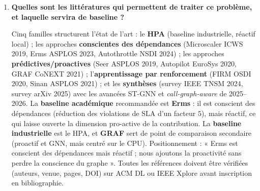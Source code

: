\documentclass[11pt,a4paper]{article}
\begin{document}
\begin{enumerate}[label=\textbf{Q\arabic*.}, leftmargin=*, itemsep=0.6em]
En trois étages. \emph{(i) Spécification} : \texttt{requests} (garantie, dénominateur du calcul HPA) et \texttt{limits} (plafond), avec \( \text{request} \le \text{limit} \). \emph{(ii) Placement} par le scheduler : filtrage des nœuds faisables \( u \in \mathcal{U}_{\text{feasible}} \) vérifiant
\[
 \sum_{c \in \text{conteneurs}(p)} \text{request}_{c,r} \;\le\; \text{capacité}_r(u) - \sum_{p' \in \text{pods}(u)} \sum_{c} \text{request}_{p',r},
\]
puis scoring \( \sum_i w_i\, s_i(u,p) \). \emph{(iii) Application et éviction} : cgroups et classes de QoS \textsc{BestEffort} \( \prec \) \textsc{Burstable} \( \prec \) \textsc{Guaranteed}. En surplomb : \texttt{ResourceQuota} (contrainte budgétaire agrégée, analogue à \( \sum_i c_i n_i(t) \le B(t) \)) et \texttt{LimitRange} (bornes par objet). Point clé : cette chaîne ne décide jamais \( n_i(t) \) ; le HPA est un contrôleur séparé dont la décision est ensuite consommée par le scheduler.

\item \textbf{Quelles sont les littératures qui permettent de traiter ce problème, et laquelle servira de baseline ?}

Cinq familles structurent l'état de l'art : le \textbf{HPA} (baseline industrielle, réactif local) ; les approches \textbf{conscientes des dépendances} (Microscaler ICWS 2019, Erms ASPLOS 2023, Autothrottle NSDI 2024) ; les approches \textbf{prédictives/proactives} (Seer ASPLOS 2019, Autopilot EuroSys 2020, GRAF CoNEXT 2021) ; l'\textbf{apprentissage par renforcement} (FIRM OSDI 2020, Sinan ASPLOS 2021) ; et les \textbf{synthèses} (survey IEEE TNSM 2024, survey arXiv 2025) avec les avancées ST-GNN et \emph{call-graph-aware} de 2025--2026. La \textbf{baseline académique} recommandée est \textbf{Erms} : il est conscient des dépendances (réduction des violations de SLA d'un facteur \(5\)), mais réactif, ce qui laisse ouverte la dimension pro-active de la contribution. La \textbf{baseline industrielle} est le HPA, et \textbf{GRAF} sert de point de comparaison secondaire (proactif et GNN, mais centré sur le CPU). Positionnement : « Erms est conscient des dépendances mais réactif ; nous ajoutons la proactivité sans perdre la conscience du graphe ». Toutes les références doivent être vérifiées (auteurs, venue, pages, DOI) sur ACM DL ou IEEE Xplore avant inscription en bibliographie.

\end{enumerate}
\end{document}
